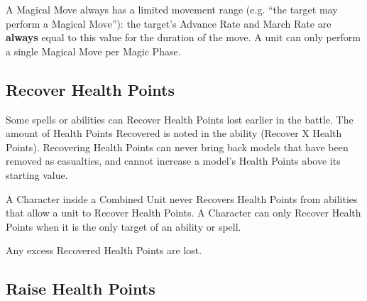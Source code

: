 A Magical Move always has a limited movement range (e.g. \enquote{the target may perform a  Magical Move}): the target's Advance Rate and March Rate are \textbf{always} equal to this value for the duration of the move. A unit can only perform a single Magical Move per Magic Phase.

\columnbreak

\subsection{Recover Health Points}
\label{recover_health_points}

Some spells or abilities can Recover Health Points lost earlier in the battle. The amount of Health Points Recovered is noted in the ability (Recover X Health Points). Recovering Health Points can never bring back models that have been removed as casualties, and cannot increase a model's Health Points above its starting value.

A Character inside a Combined Unit never Recovers Health Points from abilities that allow a unit to Recover Health Points. A Character can only Recover Health Points when it is the only target of an ability or spell.

Any excess Recovered Health Points are lost.

\subsection{Raise Health Points}
\label{raise_health_points}

